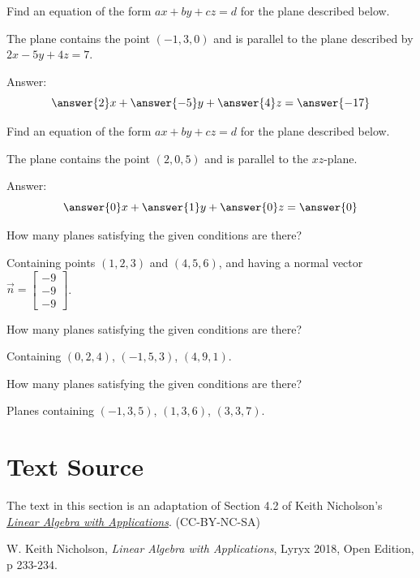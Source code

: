 \documentclass{ximera}
\begin{document}
  \begin{problem}\label{prob:eqplane2} Find an equation of the form $ax+by+cz=d$ for the plane described below.
  
  The plane contains the point $(-1, 3, 0)$ and is parallel to the plane described by $2x-5y+4z=7$.
  
  Answer:
  $$\answer{2}x+\answer{-5}y+\answer{4}z=\answer{-17}$$
  \end{problem}
  
  \begin{problem}\label{prob:eqplane3} Find an equation of the form $ax+by+cz=d$ for the plane described below.
  
  The plane contains the point $(2, 0, 5)$ and is parallel to the $xz$-plane.
  
  Answer:
  $$\answer{0}x+\answer{1}y+\answer{0}z=\answer{0}$$
  \end{problem}


\begin{problem}\label{prob:eqplane4} How many planes satisfying the given conditions are there?

Containing points $(1, 2, 3)$ and $(4, 5, 6)$, and having a normal vector $\vec{n}=\begin{bmatrix}-9\\-9\\-9\end{bmatrix}$.
\begin{multipleChoice}
 \end{multipleChoice}
\end{problem}

\begin{problem}\label{prob:eqplane5} How many planes satisfying the given conditions are there?

Containing $(0,2, 4)$, $(-1, 5, 3)$, $(4, 9, 1)$.
\begin{multipleChoice}
 \end{multipleChoice}
\end{problem}

\begin{problem}\label{prob:eqplane6} How many planes satisfying the given conditions are there?

Planes containing $(-1, 3, 5)$, $(1, 3, 6)$, $(3, 3, 7)$.
\begin{multipleChoice}
 \end{multipleChoice}
\end{problem}


\section*{Text Source}
The text in this section is an adaptation of Section 4.2 of Keith Nicholson's \href{https://open.umn.edu/opentextbooks/textbooks/linear-algebra-with-applications}{\it Linear Algebra with Applications}. (CC-BY-NC-SA)

W. Keith Nicholson, {\it Linear Algebra with Applications}, Lyryx 2018, Open Edition, p 233-234.
\end{document}
